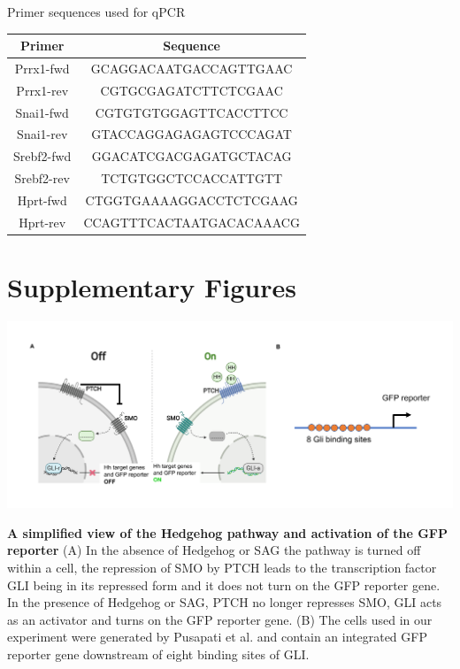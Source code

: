 \begin{supptable}[p!]
\centering
\caption{Primer sequences used for qPCR}
\begin{tabular}{ cc }
\toprule
\textbf{Primer} & \textbf{Sequence} \\
\midrule
Prrx1-fwd & GCAGGACAATGACCAGTTGAAC \\
Prrx1-rev & CGTGCGAGATCTTCTCGAAC \\
Snai1-fwd & CGTGTGTGGAGTTCACCTTCC \\
Snai1-rev & GTACCAGGAGAGAGTCCCAGAT \\
Srebf2-fwd & GGACATCGACGAGATGCTACAG \\
Srebf2-rev & TCTGTGGCTCCACCATTGTT \\
Hprt-fwd & CTGGTGAAAAGGACCTCTCGAAG \\
Hprt-rev & CCAGTTTCACTAATGACACAAACG \\
\bottomrule
\end{tabular}
\label{tab:hedgehog_tableS3}
\end{supptable}

\clearpage
\section{Supplementary Figures}

\begin{suppfigure}[p]  
    \centering
    \includegraphics[width=\linewidth]{figures/hedgehog/SuppFigure1.png}
    \caption[A simplified view of the Hedgehog pathway and activation of the GFP reporter]{
        \textbf{A simplified view of the Hedgehog pathway and activation of the GFP reporter}
        (A) In the absence of Hedgehog or SAG the pathway is turned off within a cell, the repression of SMO by PTCH leads to the transcription factor GLI being in its repressed form and it does not turn on the GFP reporter gene. In the presence of Hedgehog or SAG, PTCH no longer represses SMO, GLI acts as an activator and turns on the GFP reporter gene. (B) The cells used in our experiment were generated by Pusapati et al. and contain an integrated GFP reporter gene downstream of eight binding sites of GLI.  
    }
    \label{fig:hh_figureS1}
\end{suppfigure}


